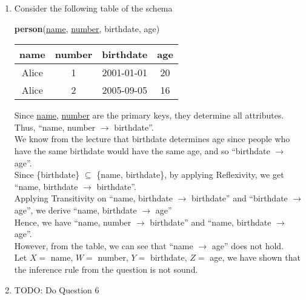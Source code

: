 \documentclass[12pt]{article}
\begin{document}
\begin{enumerate}
  \item Consider the following table of the schema
        \begin{center}
          \textbf{person}(\underline{name}, \underline{number}, birthdate, age)
        \end{center}
        \begin{center}
          \begin{tabular}{ | c | c | c | c | }
            \hline
            \textbf{name} & \textbf{number} & \textbf{birthdate} & \textbf{age} \\
            \hline
            Alice         & 1               & 2001-01-01        & 20 \\
            Alice         & 2               & 2005-09-05        & 16 \\
            \hline
          \end{tabular}
        \end{center}
        Since \underline{name}, \underline{number} are the primary keys, they       
        determine all attributes. Thus, ``name, number $\longrightarrow$
        birthdate''. \\
        We know from the lecture that birthdate determines age since people who
        have the same birthdate would have the same age, and so ``birthdate
        $\longrightarrow$ age''. \\
        Since \{birthdate\} $\subseteq$ \{name, birthdate\}, by applying
        Reflexivity, we get ``name, birthdate $\longrightarrow$ birthdate''. \\
        Applying Transitivity on ``name, birthdate $\longrightarrow$ birthdate''
        and ``birthdate $\longrightarrow$ age'', we derive ``name, birthdate
        $\longrightarrow$ age'' \\
        Hence, we have ``name, number $\longrightarrow$ birthdate'' and ``name,
        birthdate $\longrightarrow$ age''. \\
        However, from the table, we can see that ``name $\longrightarrow$ age''
        does not hold. \\
        Let $X =$ name, $W =$ number, $Y =$ birthdate, $Z =$ age, we have shown
        that the inference rule from the question is not sound.
  \ \\

  \item TODO: Do Question 6
  \ \\


\end{enumerate}
\end{document}
